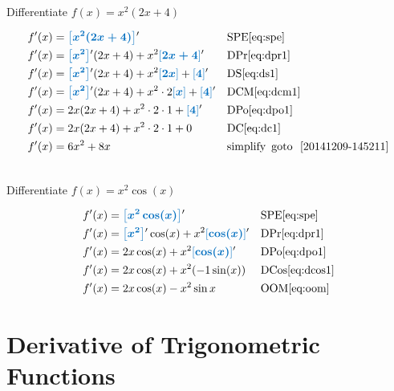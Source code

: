 \documentclass[20150903-160354-rs2.2-MarksMathNotebook.tex]{subfiles}
\begin{document}
\begin{example}[id:20141209-144203] \label{20141209-144203} \hfill \\

Differentiate $f(x)=x^2(2x+4)$

\soln

\solnsteps
\begin{align*}
f'(x)&= \farg{x^2(2x+4)}' && \text{SPE} \eqref{eq:spe} \\
f'(x)&= \farg{x^2}'(2x+4)+x^2\farg{2x+4}' && \text{DPr} \eqref{eq:dpr1} \\
f'(x)&= \farg{x^2}'(2x+4)+x^2\farg{2x}+\farg{4}' && \text{DS} \eqref{eq:ds1} \\
f'(x)&= \farg{x^2}'(2x+4)+x^2 \cdot 2 \farg{x}+\farg{4}' && \text{DCM} \eqref{eq:dcm1} \\
f'(x)&= 2x(2x+4)+ x^2\cdot 2 \cdot 1 + \farg{4}' && \text{DPo} \eqref{eq:dpo1} \\
f'(x)&= 2x(2x+4)+ x^2\cdot 2 \cdot 1 + 0 && \text{DC} \eqref{eq:dc1} \\
f'(x)&= 6x^2+8x && \text{simplify} \text{\, goto \,} \, \ref{20141209-145211}\\
\end{align*}
\end{example}


\begin{example}[id:20141209-142321] \label{20141209-142321} \hfill \\

Differentiate $f(x)=x^2 \cos(x)$

\soln

\solnsteps
\begin{align*}
f'(x)&= \farg{x^2 \cos(x)}' && \text{SPE} \eqref{eq:spe} \\
f'(x)&= \farg{x^2}' \cos(x) + x^2 \farg{\cos (x)}' && \text{DPr} \eqref{eq:dpr1} \\
f'(x)&= 2x \cos (x) + x^2 \farg{\cos (x)}' && \text{DPo} \eqref{eq:dpo1} \\
f'(x)&= 2x \cos (x) + x^2 (-1 \sin(x)) && \text{DCos} \eqref{eq:dcos1} \\
f'(x)&= 2x \cos (x) - x^2 \sin x && \text{OOM} \eqref{eq:oom}
\end{align*}
\end{example}

\section{Derivative of Trigonometric Functions}
\end{document}
